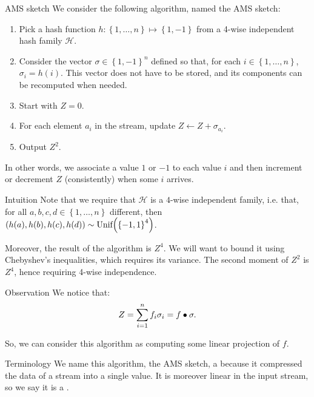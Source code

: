 \documentclass[a4paper]{article}
\begin{document}
\begin{parag}{AMS sketch}
    We consider the following algorithm, named the AMS sketch:
    \begin{enumerate}
        \item Pick a hash function $h: \left\{1, \ldots, n\right\} \mapsto \left\{1, -1\right\}$ from a 4-wise independent hash family $\mathcal{H}$.
        \item Consider the vector $\sigma \in \left\{1, -1\right\}^n$ defined so that, for each $i \in \left\{1, \ldots, n\right\}$, $\sigma_i = h\left(i\right)$. This vector does not have to be stored, and its components can be recomputed when needed.
        \item Start with $Z = 0$.
        \item For each element $a_i$ in the stream, update $Z \leftarrow Z + \sigma_{a_i}$.
        \item Output $Z^2$.
    \end{enumerate}

    In other words, we associate a value $1$ or $-1$ to each value $i$ and then increment or decrement $Z$ (consistently) when some $i$ arrives.

    \begin{subparag}{Intuition}
        Note that we require that $\mathcal{H}$ is a $4$-wise independent family, i.e. that, for all $a, b, c, d \in \left\{1, \ldots, n\right\}$ different, then $\left(h\left(a\right), h\left(b\right), h\left(c\right), h\left(d\right)\right) \followsdistr \text{Unif}\left(\left\{-1, 1\right\}^4\right)$.

        Moreover, the result of the algorithm is $Z^4$. We will want to bound it using Chebyshev's inequalities, which requires its variance. The second moment of $Z^2$ is $Z^4$, hence requiring 4-wise independence.
    \end{subparag}

    \begin{subparag}{Observation}
        We notice that: 
        \[Z = \sum_{i = 1}^{n} f_i \sigma_i = f \bullet \sigma.\]
        
        So, we can consider this algorithm as computing some linear projection of $f$.
    \end{subparag}

    \begin{subparag}{Terminology}
        We name this algorithm, the AMS sketch, a  because it compressed the data of a stream into a single value. It is moreover linear in the input stream, so we say it is a .
    \end{subparag}
\end{parag}
\end{document}
